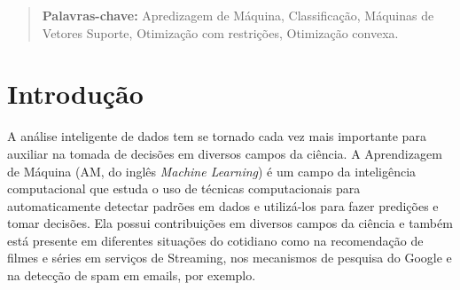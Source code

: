 \documentclass[12pt,a4paper]{scrartcl}
\theoremstyle{definition}%
\begin{document}
\begin{abstract}

\textbf{Palavras-chave:} Apredizagem de Máquina, Classificação, Máquinas de Vetores Suporte, Otimização com restrições, Otimização convexa.
\end{abstract}

\section{Introdução}

A análise inteligente de dados tem se tornado cada vez mais importante para auxiliar na tomada de decisões em diversos campos da ciência. A Aprendizagem de Máquina (AM, do inglês \textit{Machine Learning}) é um campo da inteligência computacional que estuda o uso de técnicas computacionais para automaticamente detectar padrões em dados e utilizá-los para fazer predições e tomar decisões. Ela possui contribuições em diversos campos da ciência e também está presente em diferentes situações do cotidiano como na recomendação de filmes e séries em serviços de Streaming, nos mecanismos de pesquisa do Google e na detecção de spam em emails, por exemplo. 
\end{document}
